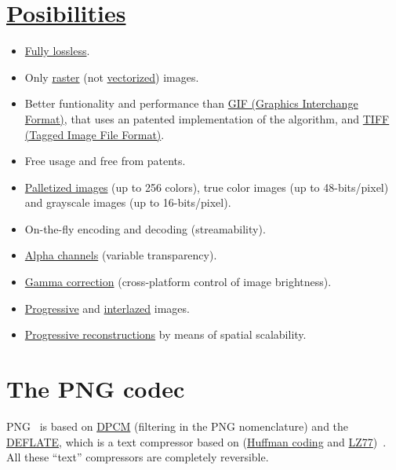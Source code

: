 \section{\href{http://www.libpng.org/pub/png/book/}{Posibilities}}
\begin{itemize}
\item \href{https://en.wikipedia.org/wiki/Lossless_compression}{Fully
  lossless}.
\item Only
  \href{https://en.wikipedia.org/wiki/Raster_graphics}{raster} (not
  \href{https://en.wikipedia.org/wiki/Vector_graphics}{vectorized})
  images.
\item Better funtionality and performance than
  \href{https://en.wikipedia.org/wiki/GIF}{GIF (Graphics Interchange
    Format)}, that uses an patented implementation of the
   algorithm, and
  \href{https://en.wikipedia.org/wiki/TIFF}{TIFF (Tagged Image File
    Format)}.
\item Free usage and free from patents.
\item
  \href{https://en.wikipedia.org/wiki/Palette_(computing)}{Palletized
    images} (up to 256 colors), true color images (up to
  48-bits/pixel) and grayscale images (up to 16-bits/pixel).
\item On-the-fly encoding and decoding (streamability).
\item \href{https://en.wikipedia.org/wiki/Alpha_compositing}{Alpha
  channels} (variable transparency).
\item \href{https://en.wikipedia.org/wiki/Gamma_correction}{Gamma
  correction} (cross-platform control of image brightness).
\item
  \href{https://en.wikipedia.org/wiki/Progressive_scan}{Progressive}
  and
  \href{https://en.wikipedia.org/wiki/Interlacing_(bitmaps)}{interlazed}
  images.
\item
  \href{http://www.libpng.org/pub/png/book/chapter08.html#png.ch08.div.6}{Progressive
    reconstructions} by means of spatial scalability.
\end{itemize} 

\section{The PNG codec}

PNG~\cite{sayood2002lossless,miano1999compressed,salomon2004data} is based on
\href{https://en.wikipedia.org/wiki/Differential_pulse-code_modulation}{DPCM}
(filtering in the PNG nomenclature) and the
\href{https://en.wikipedia.org/wiki/DEFLATE}{DEFLATE}, which is a text
compressor based on
(\href{https://en.wikipedia.org/wiki/Huffman_coding}{Huffman coding}
and
\href{https://en.wikipedia.org/wiki/LZ77_and_LZ78}{LZ77})~\cite{nelson96datacompression}. All
these ``text'' compressors are completely reversible.

